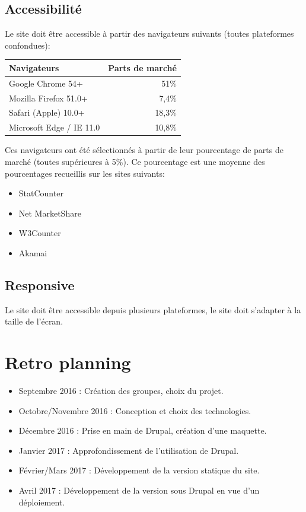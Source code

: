 \documentclass[11pt]{report}
\begin{document}
\subsection*{Accessibilité}

Le site doit être accessible à partir des navigateurs suivants (toutes plateformes confondues):
\begin{center}
	\begin{tabular}{|l | r|}
		\hline
		Navigateurs & Parts de marché \\
		\hline
		\hline
		Google Chrome 54+ & 51\% \\
		\hline
		Mozilla Firefox 51.0+ & 7,4\% \\
		\hline
		Safari (Apple) 10.0+ & 18,3\% \\
		\hline
		Microsoft Edge / IE 11.0 & 10,8\% \\
		\hline
	\end{tabular}
\end{center}
Ces navigateurs ont été sélectionnés à partir de leur pourcentage de parts de
marché (toutes supérieures à 5\%). Ce pourcentage est une moyenne des pourcentages
recueillis sur les sites suivants:
\begin{itemize}
	\item StatCounter
	\item Net MarketShare
	\item W3Counter
	\item Akamai
\end{itemize}

\subsection*{Responsive}
Le site doit être accessible depuis plusieurs plateformes, le site doit s'adapter
à la taille de l'écran.


\section{Retro planning}

\begin{itemize}
	\item Septembre 2016 : Création des groupes, choix du projet.
	\item Octobre/Novembre 2016 : Conception et choix des technologies.
	\item Décembre 2016 : Prise en main de Drupal, création d'une maquette.
	\item Janvier 2017 : Approfondissement de l'utilisation de Drupal.
	\item Février/Mars 2017 : Développement de la version statique du site.
	\item Avril 2017 : Développement de la version sous Drupal en vue d'un déploiement.
\end{itemize}
\end{document}
